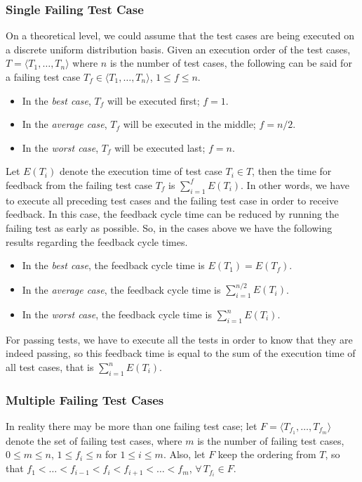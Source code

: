 \documentclass[a4paper,english,12pt]{report}
\begin{document}
\subsubsection{Single Failing Test Case}
On a theoretical level, we could assume that the test cases are being executed on a discrete uniform distribution basis. Given an execution order of the test cases, $T = \langle T_1,\ldots,T_n \rangle$ where $n$ is the number of test cases, the following can be said for a failing test case $T_f \in \langle T_1,\ldots,T_n \rangle$, $1 \leq f \leq n$.

\begin{itemize}
  \item In the \textit{best case}, $T_f$ will be executed first; $f = 1$.
  \item In the \textit{average case}, $T_f$ will be executed in the middle; $f = n/2$.
  \item In the \textit{worst case}, $T_f$ will be executed last; $f = n$.
\end{itemize}

Let $E(T_i)$ denote the execution time of test case $T_i \in T$, then the time for feedback from the failing test case $T_f$ is $\sum_{i=1}^{f}E(T_i)$. In other words, we have to execute all preceding test cases and the failing test case in order to receive feedback. In this case, the feedback cycle time can be reduced by running the failing test as early as possible. So, in the cases above we have the following results regarding the feedback cycle times.

\begin{itemize}
  \item In the \textit{best case}, the feedback cycle time is $E(T_1)=E(T_f)$.
  \item In the \textit{average case}, the feedback cycle time is $\sum_{i=1}^{n/2}E(T_i)$.
  \item In the \textit{worst case}, the feedback cycle time is $\sum_{i=1}^{n}E(T_i)$.
\end{itemize}

For passing tests, we have to execute all the tests in order to know that they are indeed passing, so this feedback time is equal to the sum of the execution time of all test cases, that is $\sum_{i=1}^{n}E(T_i)$.

\subsubsection{Multiple Failing Test Cases}
In reality there may be more than one failing test case; let $F = \langle T_{f_1},\ldots,T_{f_m} \rangle$ denote the set of failing test cases, where $m$ is the number of failing test cases, $0 \leq m \leq n$, $1 \leq f_i \leq n$ for $1 \leq i \leq m$. Also, let $F$ keep the ordering from $T$, so that $f_1 < \ldots < f_{i-1} < f_i < f_{i+1} < \ldots < f_m$, $\forall\,T_{f_i} \in F$.
\end{document}
